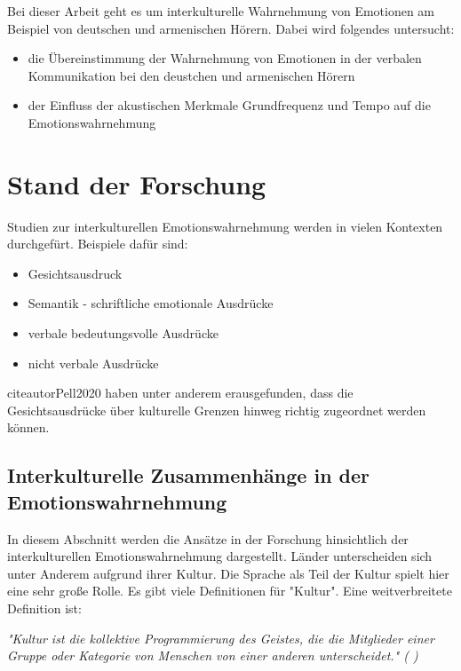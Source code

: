 \documentclass[11pt,a4paper,headsepline,twoside,toc=bibliography]{scrreprt}
\begin{document}
Bei dieser Arbeit geht es um interkulturelle Wahrnehmung von Emotionen am Beispiel von deutschen und armenischen Hörern. Dabei wird folgendes untersucht:
\begin{itemize}
	\item die Übereinstimmung der Wahrnehmung von Emotionen in der verbalen Kommunikation bei den deustchen und armenischen Hörern 
	\item der Einfluss der akustischen Merkmale Grundfrequenz und Tempo auf die Emotionswahrnehmung 
\end{itemize}


\chapter{Stand der Forschung}
\label{sec:theory}

Studien zur interkulturellen Emotionswahrnehmung werden in vielen Kontexten durchgefürt. Beispiele dafür sind: 

\begin{itemize}
	\item Gesichtsausdruck
	\item Semantik - schriftliche emotionale Ausdrücke
	\item verbale bedeutungsvolle Ausdrücke
	\item nicht verbale Ausdrücke  
	 
\end{itemize}

citeautor{Pell2020} haben unter anderem erausgefunden, dass die Gesichtsausdrücke über kulturelle Grenzen hinweg richtig zugeordnet werden können. 


\section{Interkulturelle Zusammenhänge in der Emotionswahrnehmung}
\label{sec:crosscultural_emotion}

In diesem Abschnitt werden die Ansätze in der Forschung hinsichtlich der interkulturellen Emotionswahrnehmung dargestellt. Länder unterscheiden sich unter Anderem aufgrund ihrer Kultur. Die Sprache als Teil der Kultur spielt hier eine sehr große Rolle. Es gibt viele Definitionen für "Kultur". Eine weitverbreitete Definition ist:

	\emph{"Kultur ist die kollektive Programmierung des Geistes, die die Mitglieder einer Gruppe oder Kategorie von Menschen von einer anderen unterscheidet." (\cite[s. 9]{hofstede2001culture} )}
\end{document}
